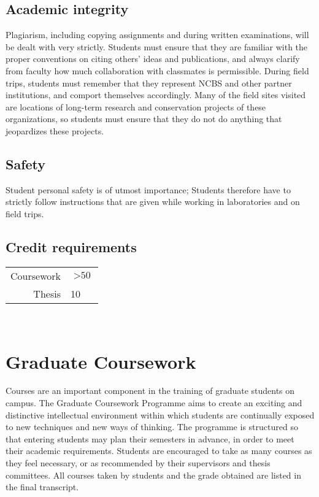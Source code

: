 \documentclass[a4paper]{extarticle}
\begin{document}
\subsection{Academic integrity} Plagiarism, including copying assignments and
during written examinations, will be dealt with very strictly. Students must
ensure that they are familiar with the proper conventions on citing others’
ideas and publications, and always clarify from faculty how much collaboration
with classmates is permissible. During field trips, students must remember that
they represent NCBS and other partner institutions, and comport themselves
accordingly. Many of the field sites visited are locations of long-term research
and conservation projects of these organizations, so students must ensure that
they do not do anything that jeopardizes these projects.

\subsection{Safety} Student personal safety is of utmost importance; Students
therefore have to strictly follow instructions that are given while working in
laboratories and on field trips.

\subsection{Credit requirements}

\begin{tabular}{r l}
    \toprule
    Coursework & $> \text{50}$ \\
    Thesis & 10 \\
  \bottomrule
\end{tabular} \newline
 

\section{Graduate Coursework}
Courses are an important component in the training of graduate students on campus. The
Graduate Coursework Programme aims to create an exciting and distinctive intellectual
environment within which students are continually exposed to new techniques and new
ways of thinking. The programme is structured so that entering students may plan their
semesters in advance, in order to meet their academic requirements. Students are encouraged
to take as many courses as they feel necessary, or as recommended by their supervisors and
thesis committees. All courses taken by students and the grade obtained are listed in the final
transcript.
\end{document}
